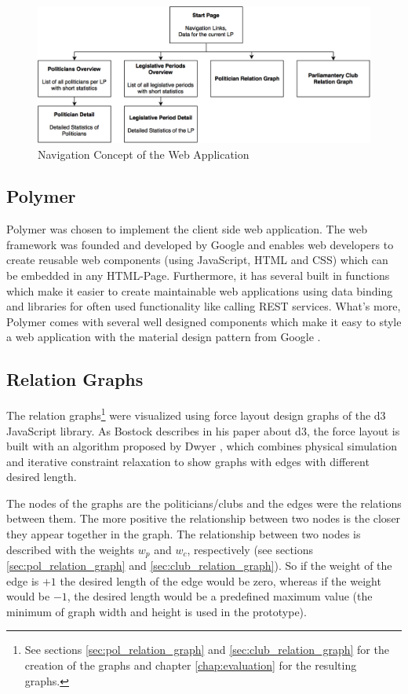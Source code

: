 \begin{figure}
	\centering
	\includegraphics[width=\textwidth]{imgs/navigation_concept}
	\caption{Navigation Concept of the Web Application}
	\label{fig:navigation_concept}
\end{figure}

\subsection{Polymer}
\label{sec:polymer}
Polymer was chosen to implement the client side web application. The web framework was founded and developed by Google and enables web developers to create reusable web components (using JavaScript, HTML and CSS) which can be embedded in any HTML-Page. Furthermore, it has several built in functions which make it easier to create maintainable web applications using data binding and libraries for often used functionality like calling REST services. What's more, Polymer comes with several well designed components which make it easy to style a web application with the material design pattern from Google \cite{Polymer_2015}.

\subsection{Relation Graphs}
The relation graphs\footnote{See sections \ref{sec:pol_relation_graph} and \ref{sec:club_relation_graph} for the creation of the graphs and chapter \ref{chap:evaluation} for the resulting graphs.} were visualized using force layout design graphs of the d3 JavaScript library. As Bostock \cite{d3_2011} describes in his paper about d3, the force layout is built with an algorithm proposed by Dwyer \cite{Dwyer_2009}, which combines physical simulation and iterative constraint relaxation to show graphs with edges with different desired length. 

The nodes of the graphs are the politicians/clubs and the edges were the relations between them. The more positive the relationship between two nodes is the closer they appear together in the graph. The relationship between two nodes is described with the weights $w_p$ and $w_c$, respectively (see sections \ref{sec:pol_relation_graph} and \ref{sec:club_relation_graph}). So if the weight of the edge is $+1$ the desired length of the edge would be zero, whereas if the weight would be $-1$, the desired length would be a predefined maximum value (the minimum of graph width and height is used in the prototype).

